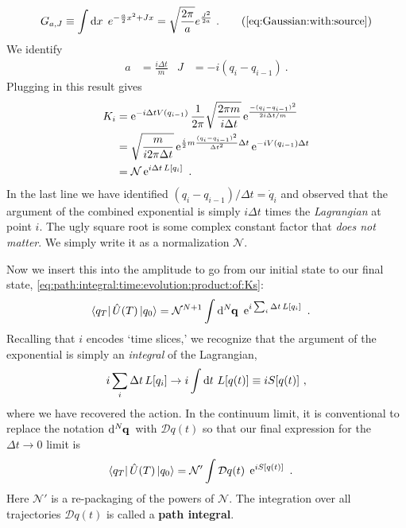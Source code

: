 \documentclass[12pt, oneside]{report}    %
\begin{document}
\begin{align}
    G_{a,J} \equiv \int \D{x}\; e^{-\frac{a}{2}x^2 + Jx} = \sqrt{\frac{2\pi}{a}}  e^{\frac{J^2}{2a}} \ .
    \tag{\ref{eq:Gaussian:with:source}}
\end{align}
We identify
\begin{align}
    a &= \frac{i\Delta t}{m}
    &
    J&= -i(q_i - q_{i-1}) \ .
\end{align}
Plugging in this result gives
\begin{align}
    K_i &=
    \e^{-i\Delta tV(q_{i-1})} 
    \frac{1}{2\pi}
    \sqrt{\frac{2\pi m}{i \Delta t}}
    \e^{\frac{-(q_i-q_{i-1})^2}{2i\Delta t/m}}
    \\
    &=
    \sqrt{\frac{m}{i 2\pi \Delta t}}
    \e^{\frac{i}{2}m\frac{(q_i-q_{i-1})^2}{\Delta t^2}\Delta t}
    \e^{-iV(q_{i-1})\Delta t} 
    \\
    &= \mathcal N \e^{i\Delta t\, L[q_i]}
    \label{eq:path:integral:infinitesmimal:kernel}
     \ .
\end{align}
In the last line we have identified $(q_i-q_{i-1})/\Delta t = \dot q_i$ and observed that the argument of the combined exponential is simply $i\Delta t$ times the \emph{Lagrangian} at point $i$. The ugly square root is some complex constant factor that \emph{does not matter}. We simply write it as a normalization $\mathcal N$. 

Now we insert this into the amplitude to go from our initial state to our final state, \eqref{eq:path:integral:time:evolution:product:of:Ks}:
\begin{align}
    \bra{q_T} \hat U(T) \ket{q_0} 
    &= \mathcal N^{N+1} \int \D[N]{\vec{q}} \,
    \e^{i \sum_i \Delta t\, L[q_i]} \ .
\end{align}
Recalling that $i$ encodes `time slices,' we recognize that the argument of the exponential is simply an \emph{integral} of the Lagrangian,
\begin{align}
    i \sum_i \Delta t\, L[q_i] \to i\int \D{t}\, L[q(t)] \equiv iS[q(t)] \ ,
\end{align}
where we have recovered the action. In the continuum limit, it is conventional to replace the notation $\D[N]{\vec{q}}$ with $\mathcal{D}q(t)$ so that our final expression for the $\Delta t \to 0$ limit is
\begin{align}
    \bra{q_T} \hat U(T) \ket{q_0} 
    &= \mathcal N' \int \mathcal{D}q(t)\;
    \e^{i S[q(t)]} \ .
    \label{eq:path:integral:formalism}
\end{align}
Here $\mathcal N'$ is a re-packaging of the powers of $\mathcal N$. The integration over all trajectories $\mathcal {D}q(t)$ is called a \textbf{path integral}.
\end{document}
